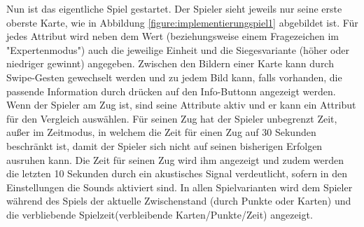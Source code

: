 Nun ist das eigentliche Spiel gestartet. Der Spieler sieht jeweils nur seine erste oberste Karte, wie in Abbildung \ref{figure:implementierungspiel1} abgebildet ist. Für jedes Attribut wird neben dem Wert (beziehungsweise einem Fragezeichen im "Expertenmodus") auch die jeweilige Einheit und die Siegesvariante (höher oder niedriger gewinnt) angegeben. Zwischen den Bildern einer Karte kann durch Swipe-Gesten gewechselt werden und zu jedem Bild kann, falls vorhanden, die passende Information durch drücken auf den Info-Buttonn angezeigt werden. Wenn der Spieler am Zug ist, sind seine Attribute aktiv und er kann ein Attribut für den Vergleich auswählen. Für seinen Zug hat der Spieler unbegrenzt Zeit, außer im Zeitmodus, in welchem die Zeit für einen Zug auf 30 Sekunden beschränkt ist, damit der Spieler sich nicht auf seinen bisherigen Erfolgen ausruhen kann. Die Zeit für seinen Zug wird ihm angezeigt und zudem werden die letzten 10 Sekunden durch ein akustisches Signal verdeutlicht, sofern in den Einstellungen die Sounds aktiviert sind. In allen Spielvarianten wird dem Spieler während des Spiels der aktuelle Zwischenstand (durch Punkte oder Karten) und die verbliebende Spielzeit(verbleibende Karten/Punkte/Zeit) angezeigt.\\

